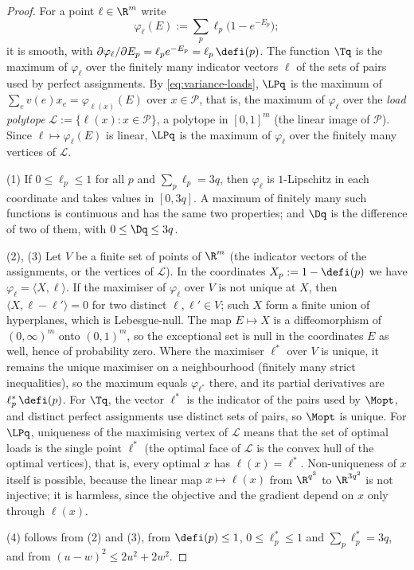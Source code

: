 \begin{proof}
For a point $\ell\in\R^m$ write
\[
\varphi_\ell(E):=\sum_p\ell_p\bigl(1-e^{-E_p}\bigr);
\]
it is smooth, with $\partial\varphi_\ell/\partial E_p=\ell_pe^{-E_p}=\ell_p\,\defi(p)$. The
function $\Tq$ is the maximum of $\varphi_\ell$ over the finitely many indicator vectors
$\ell$ of the sets of pairs used by perfect assignments. By \eqref{eq:variance-loads},
$\LPq$ is the maximum of $\sum_ev(e)x_e=\varphi_{\ell(x)}(E)$ over $x\in\mathcal P$, that
is, the maximum of $\varphi_\ell$ over the \emph{load polytope}
$\mathcal L:=\{\ell(x):x\in\mathcal P\}$, a polytope in $[0,1]^m$ (the linear image of
$\mathcal P$). Since $\ell\mapsto\varphi_\ell(E)$ is linear, $\LPq$ is the maximum of
$\varphi_\ell$ over the finitely many vertices of $\mathcal L$.

(1) If $0\le\ell_p\le1$ for all $p$ and $\sum_p\ell_p=3q$, then $\varphi_\ell$ is
$1$-Lipschitz in each coordinate and takes values in $[0,3q]$. A maximum of finitely many
such functions is continuous and has the same two properties; and $\Dq$ is the difference
of two of them, with $0\le\Dq\le3q$.

(2), (3) Let $V$ be a finite set of points of $\R^m$ (the indicator vectors of the
assignments, or the vertices of $\mathcal L$). In the coordinates $X_p:=1-\defi(p)$ we
have $\varphi_\ell=\langle X,\ell\rangle$. If the maximiser of $\varphi_\ell$ over $V$ is
not unique at $X$, then $\langle X,\ell-\ell'\rangle=0$ for two distinct
$\ell,\ell'\in V$; such $X$ form a finite union of hyperplanes, which is Lebesgue-null.
The map $E\mapsto X$ is a diffeomorphism of $(0,\infty)^m$ onto $(0,1)^m$, so the
exceptional set is null in the coordinates $E$ as well, hence of probability zero. Where
the maximiser $\ell^*$ over $V$ is unique, it remains the unique maximiser on a
neighbourhood (finitely many strict inequalities), so the maximum equals
$\varphi_{\ell^*}$ there, and its partial derivatives are $\ell^*_p\,\defi(p)$. For $\Tq$,
the vector $\ell^*$ is the indicator of the pairs used by $\Mopt$, and distinct perfect
assignments use distinct sets of pairs, so $\Mopt$ is unique. For $\LPq$, uniqueness of the
maximising vertex of $\mathcal L$ means that the set of optimal loads is the single point
$\ell^*$ (the optimal face of $\mathcal L$ is the convex hull of the optimal vertices),
that is, every optimal $x$ has $\ell(x)=\ell^*$. Non-uniqueness of $x$ itself is possible,
because the linear map $x\mapsto\ell(x)$ from $\R^{q^3}$ to $\R^{3q^2}$ is not injective;
it is harmless, since the objective and the gradient depend on $x$ only through $\ell(x)$.

(4) follows from (2) and (3), from $\defi(p)\le1$, $0\le\ell^*_p\le1$ and
$\sum_p\ell^*_p=3q$, and from $(u-w)^2\le2u^2+2w^2$.
\end{proof}
